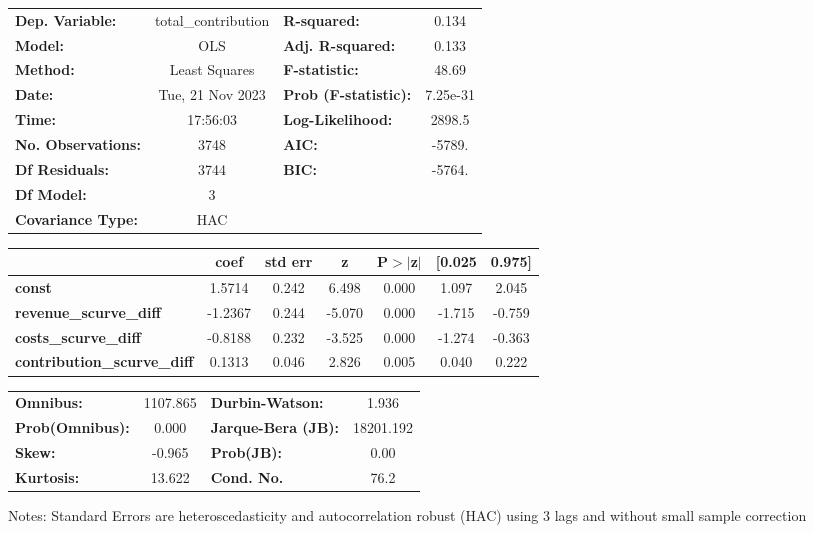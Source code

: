 \begin{center}
\begin{tabular}{lclc}
\toprule
\textbf{Dep. Variable:}             & total\_contribution & \textbf{  R-squared:         } &     0.134   \\
\textbf{Model:}                     &         OLS         & \textbf{  Adj. R-squared:    } &     0.133   \\
\textbf{Method:}                    &    Least Squares    & \textbf{  F-statistic:       } &     48.69   \\
\textbf{Date:}                      &   Tue, 21 Nov 2023  & \textbf{  Prob (F-statistic):} &  7.25e-31   \\
\textbf{Time:}                      &       17:56:03      & \textbf{  Log-Likelihood:    } &    2898.5   \\
\textbf{No. Observations:}          &          3748       & \textbf{  AIC:               } &    -5789.   \\
\textbf{Df Residuals:}              &          3744       & \textbf{  BIC:               } &    -5764.   \\
\textbf{Df Model:}                  &             3       & \textbf{                     } &             \\
\textbf{Covariance Type:}           &         HAC         & \textbf{                     } &             \\
\bottomrule
\end{tabular}
\begin{tabular}{lcccccc}
                                    & \textbf{coef} & \textbf{std err} & \textbf{z} & \textbf{P$> |$z$|$} & \textbf{[0.025} & \textbf{0.975]}  \\
\midrule
\textbf{const}                      &       1.5714  &        0.242     &     6.498  &         0.000        &        1.097    &        2.045     \\
\textbf{revenue\_scurve\_diff}      &      -1.2367  &        0.244     &    -5.070  &         0.000        &       -1.715    &       -0.759     \\
\textbf{costs\_scurve\_diff}        &      -0.8188  &        0.232     &    -3.525  &         0.000        &       -1.274    &       -0.363     \\
\textbf{contribution\_scurve\_diff} &       0.1313  &        0.046     &     2.826  &         0.005        &        0.040    &        0.222     \\
\bottomrule
\end{tabular}
\begin{tabular}{lclc}
\textbf{Omnibus:}       & 1107.865 & \textbf{  Durbin-Watson:     } &     1.936  \\
\textbf{Prob(Omnibus):} &   0.000  & \textbf{  Jarque-Bera (JB):  } & 18201.192  \\
\textbf{Skew:}          &  -0.965  & \textbf{  Prob(JB):          } &      0.00  \\
\textbf{Kurtosis:}      &  13.622  & \textbf{  Cond. No.          } &      76.2  \\
\bottomrule
\end{tabular}
\end{center}

Notes: \newline
 [1] Standard Errors are heteroscedasticity and autocorrelation robust (HAC) using 3 lags and without small sample correction